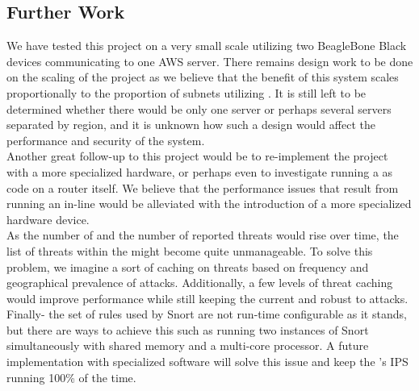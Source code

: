 \subsection{Further Work}
\label{sec:concl:further}
We have tested this project on a very small scale utilizing two BeagleBone Black devices communicating to one AWS server. There remains design work to be done on the scaling of the project as we believe that the benefit of this system scales proportionally to the proportion of subnets utilizing \sysname. It is still left to be determined whether there would be only one \servname server or perhaps several \servname servers separated by region, and it is unknown how such a design would affect the performance and security of the \sysname system. \\

Another great follow-up to this project would be to re-implement the project with a more specialized hardware, or perhaps even to investigate running a \nodename as code on a router itself. We believe that the performance issues that result from running an in-line \nodename would be alleviated with the introduction of a more specialized hardware device. \\

As the number of \nodenames and the number of reported threats would rise over time, the list of threats within the \servname might become quite unmanageable. To solve this problem, we imagine a sort of caching on threats based on frequency and geographical prevalence of attacks. Additionally, a few levels of threat caching would improve performance while still keeping the \nodename current and robust to attacks. \\

Finally- the set of rules used by Snort are not run-time configurable as it stands, but there are ways to achieve this such as running two instances of Snort simultaneously with shared memory and a multi-core processor. A future implementation with specialized software will solve this issue and keep the \nodename's IPS running 100\% of the time.